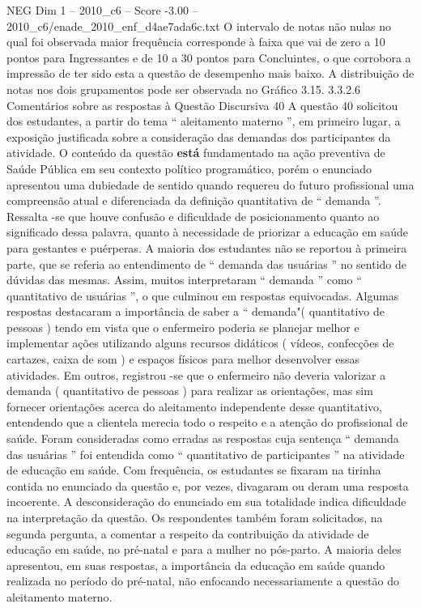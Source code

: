 \begin{textsample}{NEG Dim 1 – 2010\_c6 – Score -3.00 – 2010\_c6/enade\_2010\_enf\_d4ae7ada6c.txt}
O intervalo de notas não nulas no qual foi observada maior frequência corresponde à faixa que vai de zero a 10 pontos para Ingressantes e de 10 a 30 pontos para Concluintes, o que corrobora a impressão de ter sido esta a questão de desempenho mais baixo.
A distribuição de notas nos dois grupamentos pode ser observada no Gráfico 3.15. 3.3.2.6 Comentários sobre as respostas à Questão Discursiva 40 A questão 40 solicitou dos estudantes, a partir do tema “ aleitamento materno ”, em primeiro lugar, a exposição justificada sobre a consideração das demandas dos participantes da atividade.
O conteúdo da questão \textbf{está} fundamentado na ação preventiva de Saúde Pública em seu contexto político programático, porém o enunciado apresentou uma dubiedade de sentido quando requereu do futuro profissional uma compreensão atual e diferenciada da definição quantitativa de “ demanda ”.
Ressalta -se que houve confusão e dificuldade de posicionamento quanto ao significado dessa palavra, quanto à necessidade de priorizar a educação em saúde para gestantes e puérperas.
A maioria dos estudantes não se reportou à primeira parte, que se referia ao entendimento de “ demanda das usuárias ” no sentido de dúvidas das mesmas.
Assim, muitos interpretaram “ demanda ” como “ quantitativo de usuárias ”, o que culminou em respostas equivocadas.
Algumas respostas destacaram a importância de saber a “ demanda"( quantitativo de pessoas ) tendo em vista que o enfermeiro poderia se planejar melhor e implementar ações utilizando alguns recursos didáticos ( vídeos, confecções de cartazes, caixa de som ) e espaços físicos para melhor desenvolver essas atividades.
Em outros, registrou -se que o enfermeiro não deveria valorizar a demanda ( quantitativo de pessoas ) para realizar as orientações, mas sim fornecer orientações acerca do aleitamento independente desse quantitativo, entendendo que a clientela merecia todo o respeito e a atenção do profissional de saúde.
Foram consideradas como erradas as respostas cuja sentença “ demanda das usuárias ” foi entendida como “ quantitativo de participantes ” na atividade de educação em saúde.
Com frequência, os estudantes se fixaram na tirinha contida no enunciado da questão e, por vezes, divagaram ou deram uma resposta incoerente.
A desconsideração do enunciado em sua totalidade indica dificuldade na interpretação da questão.
Os respondentes também foram solicitados, na segunda pergunta, a comentar a respeito da contribuição da atividade de educação em saúde, no pré-natal e para a mulher no pós-parto.
A maioria deles apresentou, em suas respostas, a importância da educação em saúde quando realizada no período do pré-natal, não enfocando necessariamente a questão do aleitamento materno.

\end{textsample}
